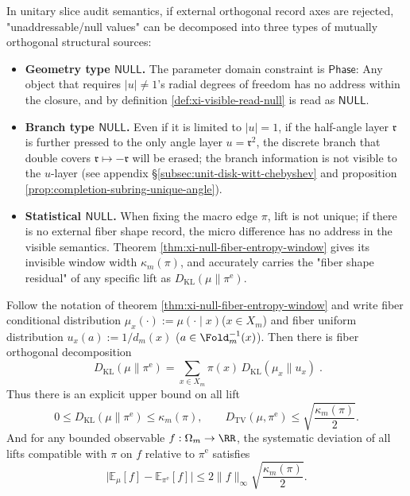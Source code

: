 \begin{remark}\label{rem:xi-null-three-kinds}
In unitary slice audit semantics, if external orthogonal record axes are rejected, "unaddressable/null values" can be decomposed into three types of mutually orthogonal structural sources:
\begin{itemize}
  \item \textbf{Geometry type \(\mathsf{NULL}\).} The parameter domain constraint is \(\mathsf{Phase}\): Any object that requires \(|u|\neq 1\)’s radial degrees of freedom has no address within the closure, and by definition \ref{def:xi-visible-read-null} is read as \(\mathsf{NULL}\).
  \item \textbf{Branch type \(\mathsf{NULL}\).} Even if it is limited to \(|u|=1\), if the half-angle layer \(\mathfrak r\) is further pressed to the only angle layer \(u=\mathfrak r^2\), the discrete branch that double covers \(\mathfrak r\mapsto-\mathfrak r\) will be erased; the branch information is not visible to the \(u\)-layer (see appendix \S\ref{subsec:unit-disk-witt-chebyshev} and proposition \ref{prop:completion-subring-unique-angle}).
  \item \textbf{Statistical \(\mathsf{NULL}\).} When fixing the macro edge \(\pi\), lift is not unique; if there is no external fiber shape record, the micro difference has no address in the visible semantics.
  Theorem \ref{thm:xi-null-fiber-entropy-window} gives its invisible window width \(\kappa_m(\pi)\), and accurately carries the "fiber shape residual" of any specific lift as \(D_{\mathrm{KL}}(\mu\|\pi^{\mathrm{e}})\).
\end{itemize}
\end{remark}

\begin{corollary}\label{cor:xi-null-statistical-radius}
Follow the notation of theorem \ref{thm:xi-null-fiber-entropy-window} and write fiber conditional distribution \(\mu_x(\cdot):=\mu(\cdot\mid x)\) ​​(\(x\in X_m\)) and fiber uniform distribution \(u_x(a):=1/d_m(x)\) (\(a\in\Fold_m^{-1}(x)\)).
Then there is fiber orthogonal decomposition
\[
\boxed{\;
D_{\mathrm{KL}}(\mu\|\pi^{\mathrm{e}})
=\sum_{x\in X_m}\pi(x)\,D_{\mathrm{KL}}(\mu_x\|u_x)\; }.
\]
Thus there is an explicit upper bound on all lift
\[
0\le D_{\mathrm{KL}}(\mu\|\pi^{\mathrm{e}})\le \kappa_m(\pi),
\qquad
D_{\mathrm{TV}}(\mu,\pi^{\mathrm{e}})\le \sqrt{\frac{\kappa_m(\pi)}{2}}.
\]
And for any bounded observable \(f:\Omega_m\to\RR\), the systematic deviation of all lifts compatible with \(\pi\) on \(f\) relative to \(\pi^{\mathrm{e}}\) satisfies
\[
\bigl|\mathbb{E}_\mu[f]-\mathbb{E}_{\pi^{\mathrm{e}}}[f]\bigr|
\le 2\|f\|_\infty\sqrt{\frac{\kappa_m(\pi)}{2}}.
\]
\end{corollary}

